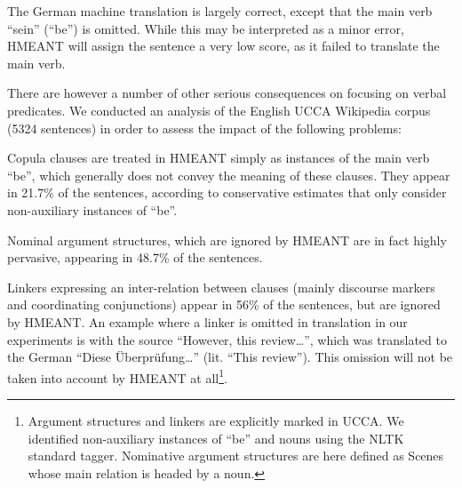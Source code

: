\documentclass[11pt,letterpaper]{article}
\newcommand{\XXX}[1]{{\color{red}XXX #1}} %
\def\equo#1{``{#1}''}  %
\begin{document}
The German machine translation 
is largely correct, except that the main verb ``sein'' (``be'') is omitted.
While this may be interpreted as a minor error, HMEANT will assign the
sentence a very low score, as it failed to translate the main verb.

There are however a number of other serious consequences on focusing on verbal
predicates. We conducted an analysis of the English UCCA Wikipedia
corpus (5324 sentences)
in order to assess the impact of the following problems: 
\\
\begin{inparadesc}
\item[Copula clauses] are treated in HMEANT simply as instances of the main verb ``be'', which
generally does not convey the meaning of these clauses. They appear in 21.7\% of the sentences,
according to conservative estimates that only consider non-auxiliary instances of ``be''.
\\
\item[Nominal argument structures,] which are ignored by  HMEANT are in fact highly
pervasive, appearing in 48.7\% of the sentences.
\\
\item[Linkers] expressing an inter-relation between
clauses (mainly discourse markers and coordinating conjunctions) appear in 56\% of the
sentences, but are ignored by HMEANT.
An example where a linker is omitted in translation in our experiments is
with the source \equo{However, this review\dots}, which was translated to
the German \equo{Diese \"Uberpr\"ufung\dots} (lit. \equo{This review}).
This omission will not be taken into account by HMEANT at all\footnote{Argument structures and linkers are explicitly marked in UCCA. We identified non-auxiliary instances of ``be'' and nouns using the NLTK standard tagger. Nominative argument structures are here defined as Scenes whose main relation is headed by a noun.}.
\end{inparadesc}

 
\end{document}
